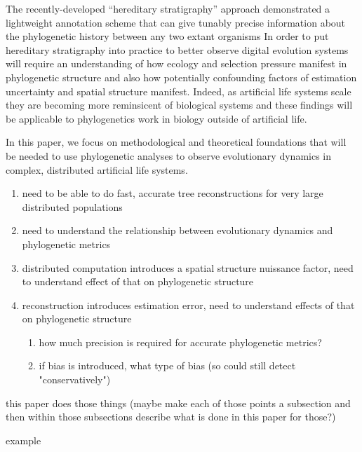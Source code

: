 The recently-developed ``hereditary stratigraphy'' approach demonstrated a lightweight annotation scheme that can give tunably precise information about the phylogenetic history between any two extant organisms
In order to put hereditary stratigraphy into practice to better observe digital evolution systems will require an understanding of how ecology and selection pressure manifest in phylogenetic structure and also how potentially confounding factors of estimation uncertainty and spatial structure manifest.
Indeed, as artificial life systems scale they are becoming more reminsicent of biological systems and these findings will be applicable to phylogenetics work in biology outside of artificial life.

In this paper, we focus on methodological and theoretical foundations that will be needed to use phylogenetic analyses to observe evolutionary dynamics in complex, distributed artificial life systems.
\begin{enumerate}
    \item need to be able to do fast, accurate tree reconstructions for very large distributed populations
    \item need to understand the relationship between evolutionary dynamics and phylogenetic metrics 
    \item distributed computation introduces a spatial structure nuissance factor, need to understand effect of that on phylogenetic structure
    \item reconstruction introduces estimation error, need to understand effects of that on phylogenetic structure
    \begin{enumerate}
        \item how much precision is required for accurate phylogenetic metrics?
        \item if bias is introduced, what type of bias (so could still detect "conservatively")
    \end{enumerate}
    \end{enumerate}

this paper does those things (maybe make each of those points a subsection and then within those subsections describe what is done in this paper for those?)

example \citep{gagliardi2019international}
